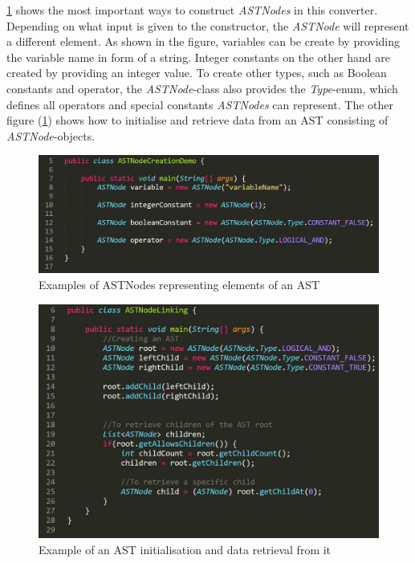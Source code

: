  \ref{fig:ASTNode} shows the most important ways to construct \emph{ASTNodes} in this converter. Depending on what input is given to the constructor, the \emph{ASTNode} will represent a different element. As shown in the figure, variables can be create by providing the variable name in form of a string. Integer constants on the other hand are created by providing an integer value. To create other types, such as Boolean constants and operator, the \emph{ASTNode}-class also provides the \emph{Type}-enum, which defines all operators and special constants \emph{ASTNodes} can represent. The other figure (\ref{fig:ASTNode}) shows how to initialise and retrieve data from an AST consisting of \emph{ASTNode}-objects.

\begin{figure}[H]
    \centering
    \includegraphics[scale=0.55]{Sections/Images/ASTNodes.JPG}
    \caption{Examples of ASTNodes representing elements of an AST}
    \label{fig:ASTNode}
\end{figure}

\begin{figure}[H]
    \centering
    \includegraphics[scale=0.6]{Sections/Images/ASTLinking.JPG}
    \caption{Example of an AST initialisation and data retrieval from it}
    \label{fig:ASTLinking}
\end{figure}

